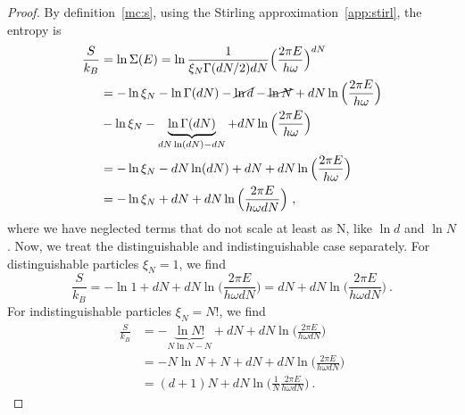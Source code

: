     \begin{proof}
        By definition~\eqref{mc:s}, using the Stirling approximation~\eqref{app:stirl}, the entropy is
        \begin{equation*}
        \begin{aligned}
            \frac{S}{k_B} & = \ln \Sigma (E) = \ln \frac{1}{\xi_N \Gamma(dN/2) d N} \Big ( \frac{2 \pi E}{h \omega} \Big)^{dN} \\ & = - \ln \xi_N - \ln \Gamma (dN) - \cancel{\ln d} - \cancel{\ln N} + d N \ln \Big (\frac{2 \pi E }{h \omega} \Big ) \\ & - \ln \xi_N - \underbrace{\ln \Gamma (dN)}_{dN \ln (dN) - dN} + d N \ln \Big (\frac{2 \pi E }{h \omega} \Big ) \\ & = - \ln \xi_N - dN \ln (dN) + d N + dN \ln \Big (\frac{2 \pi E }{h \omega} \Big ) \\ & = - \ln \xi_N + d N + d N \ln \Big (\frac{2 \pi E }{h \omega d N} \Big ) ~,
        \end{aligned}
        \end{equation*}
        where we have neglected terms that do not scale at least as N, like $\ln d$ and $\ln N$. Now, we treat the distinguishable and indistinguishable case separately. For distinguishable particles $\xi_N = 1$, we find
        \begin{equation*}
            \frac{S}{k_B} = - \ln 1 + d N + d N \ln \Big (\frac{2 \pi E }{h \omega d N} \Big ) = d N + d N \ln \Big (\frac{2 \pi E }{h \omega d N} \Big ) ~.
        \end{equation*}
        For indistinguishable particles $\xi_N = N!$, we find
        \begin{equation*}
        \begin{aligned}
            \frac{S}{k_B} & = - \underbrace{\ln N!}_{N \ln N - N} + d N + d N \ln \Big (\frac{2 \pi E }{h \omega d N} \Big ) \\ & =  - N \ln N + N + d N + d N \ln \Big (\frac{2 \pi E }{h \omega d N} \Big ) \\ & = (d+1) N + d N \ln \Big ( \frac{1}{N} \frac{2 \pi E }{h \omega d N} \Big ) ~.
        \end{aligned}
        \end{equation*}
    \end{proof}

